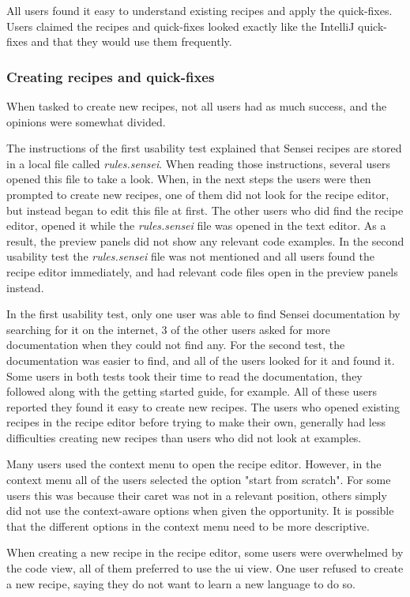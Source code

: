 All users found it easy to understand existing recipes and apply the quick-fixes.
Users claimed the recipes and quick-fixes looked exactly like the IntelliJ quick-fixes and that they would use them frequently.

\subsubsection{Creating recipes and quick-fixes}
When tasked to create new recipes, not all users had as much success, and the opinions were somewhat divided.

The instructions of the first usability test explained that Sensei recipes are stored in a local file called \textit{rules.sensei}.
When reading those instructions, several users opened this file to take a look.
When, in the next steps the users were then prompted to create new recipes, one of them did not look for the recipe editor, but instead began to edit this file at first.
The other users who did find the recipe editor, opened it while the \textit{rules.sensei} file was opened in the text editor.
As a result, the preview panels did not show any relevant code examples.
In the second usability test the \textit{rules.sensei} file was not mentioned and all users found the recipe editor immediately, and had relevant code files open in the preview panels instead.

In the first usability test, only one user was able to find Sensei documentation by searching for it on the internet, 3 of the other users asked for more documentation when they could not find any.
For the second test, the documentation was easier to find, and all of the users looked for it and found it.
Some users in both tests took their time to read the documentation, they followed along with the getting started guide, for example.
All of these users reported they found it easy to create new recipes.
The users who opened existing recipes in the recipe editor before trying to make their own, generally had less difficulties creating new recipes than users who did not look at examples.

Many users used the context menu to open the recipe editor.
However, in the context menu all of the users selected the option "start from scratch".
For some users this was because their caret was not in a relevant position, others simply did not use the context-aware options when given the opportunity.
It is possible that the different options in the context menu need to be more descriptive.

When creating a new recipe in the recipe editor, some users were overwhelmed by the code view, all of them preferred to use the \gls{ui} view.
One user refused to create a new recipe, saying they do not want to learn a new language to do so.

